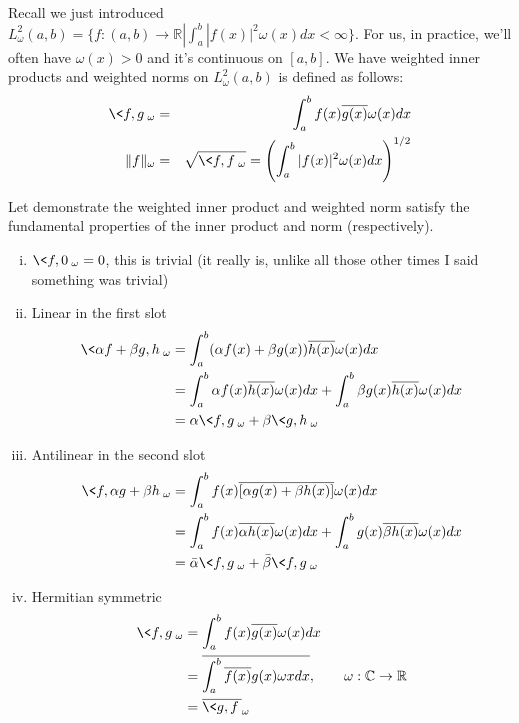 
Recall we just introduced $L^{2}_{\omega}(a,b) = \{
f:(a,b)\to\mathbb{R} |
\int^{b}_{a}|f(x)|^{2}\omega(x)dx<\infty\}$. For us, in
practice, we'll often have $\omega(x)>0$ and it's continuous
on $[a,b]$. We have weighted inner products and weighted
norms on $L^{2}_{\omega}(a,b)$ is defined as follows:
\begin{eqnarray}
\<f,g\>_{\omega} &=& \int^{b}_{a}f(x)\overline{g(x)}\omega(x)dx\\
\|f\|_{\omega} &=& \sqrt{\<f,f\>_{\omega}} = \left(\int^{b}_{a}|f(x)|^{2}\omega(x)dx\right)^{1/2}
\end{eqnarray}

Let demonstrate the weighted inner product 
and weighted norm
satisfy the fundamental properties of the inner product and
norm (respectively).
\begin{enumerate}[(i)]
\item $\<f,0\>_{\omega}=0$, this is trivial (it really is,
  unlike all those other times I said something was trivial)
\item Linear in the first slot 
\begin{align*}
\<\alpha f+\beta g,h\>_{\omega} &= \int^{b}_{a} (\alpha f(x)+\beta g(x))\overline{h(x)}\omega(x)dx\\
&=\int^{b}_{a} \alpha f(x)\overline{h(x)}\omega(x)dx +
\int^{b}_{a} \beta g(x)\overline{h(x)}\omega(x)dx\\
&= \alpha\<f,g\>_{\omega} + \beta\<g,h\>_{\omega}
\end{align*}
\item Antilinear in the second slot  \begin{align*}
\<f,\alpha g+\beta h\>_{\omega} &=
\int^{b}_{a}f(x)\overline{[\alpha g(x)+\beta h(x)]}\omega(x)dx\\
&=\int^{b}_{a} f(x)\overline{\alpha h(x)}\omega(x)dx +
\int^{b}_{a} g(x)\overline{\beta h(x)}\omega(x)dx\\
&=\bar{\alpha}\<f,g\>_{\omega} + \bar{\beta}\<f,g\>_{\omega}
\end{align*}
\item Hermitian symmetric
\begin{align*}
\<f,g\>_{\omega} &=\int^{b}_{a}f(x)\overline{g(x)}\omega(x)dx\\
&=\overline{\int^{b}_{a}\overline{f(x)}g(x)\omega{x}dx},\qquad\omega:\mathbb{C}\to\mathbb{R}\\
&=\overline{\<g,f\>}_{\omega}
\end{align*}
\end{enumerate}

